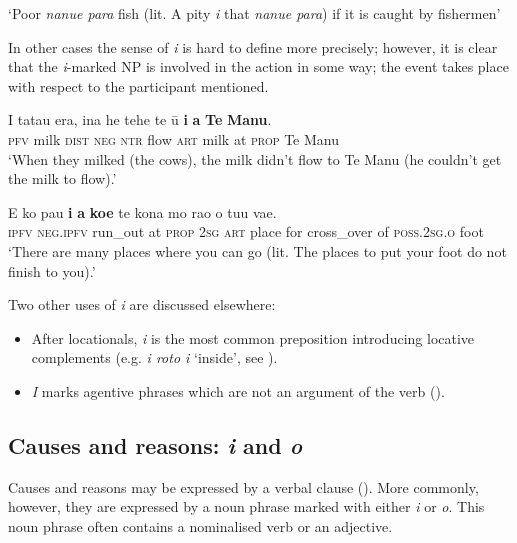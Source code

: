 \glt
‘Poor \textit{nanue para} fish (lit. A pity \textit{i} that \textit{nanue para}) if it is caught by fishermen’ \textstyleExampleref{[R301.320]} 
\z

In other cases the sense of \textit{i} is hard to define more precisely; however, it is clear that the \textit{i}{}-marked NP is involved in the action in some way; the event takes place with respect to the participant mentioned.

\ea\label{ex:4.259}
\gll I tatau era, {\ꞌ}ina he tehe te ū \textbf{i} \textbf{a} \textbf{Te} \textbf{Manu}.\\
\textsc{pfv} milk \textsc{dist} \textsc{neg} \textsc{ntr} flow \textsc{art} milk at \textsc{prop} Te Manu\\

\glt 
‘When they milked (the cows), the milk didn’t flow to Te Manu (he couldn’t get the milk to flow).’ \textstyleExampleref{[R245.192]} 
\z

\ea\label{ex:4.260}
\gll E ko pau \textbf{i} \textbf{a} \textbf{koe} te kona mo rao o tu{\ꞌ}u va{\ꞌ}e. \\
\textsc{ipfv} \textsc{neg.ipfv} run\_out at \textsc{prop} \textsc{2sg} \textsc{art} place for cross\_over of \textsc{poss.2sg.o} foot \\

\glt 
‘There are many places where you can go (lit. The places to put your foot do not finish to you).’ \textstyleExampleref{[R315.071]} 
\z

Two other uses of \textit{i} are discussed elsewhere:

\begin{itemize}
\item 
After locationals, \textit{i} is the most common preposition introducing locative complements (e.g. \textit{{\ꞌ}i roto i} ‘inside’, see ).

\item 
{}\textit{I} marks agentive phrases which are not an argument of the verb (). 

\end{itemize}

\subsection{Causes and reasons: \textit{{\ꞌ}i} and \textit{{\ꞌ}o}} \label{sec:4.7.2.2}
Causes and reasons may be expressed by a verbal clause (). More commonly, however, they are expressed by a noun phrase marked with either \textit{{\ꞌ}i} or \textit{{\ꞌ}o}. This noun phrase often contains a nominalised verb or an adjective.

